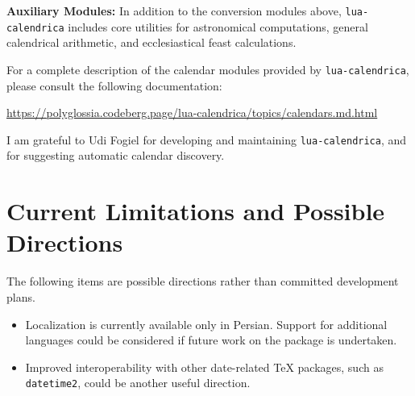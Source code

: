 \documentclass[10pt]{article}
\begin{document}
\noindent\textbf{Auxiliary Modules:} In addition to the conversion modules above, \texttt{lua-calendrica} includes core utilities for astronomical computations, general calendrical arithmetic, and ecclesiastical feast calculations.


For a complete description of the calendar modules provided by
\texttt{lua-calendrica}, please consult the following documentation:

\begin{center}
    \url{https://polyglossia.codeberg.page/lua-calendrica/topics/calendars.md.html}
\end{center}

I am grateful to Udi Fogiel for developing and maintaining \texttt{lua-calendrica}, and for suggesting automatic calendar discovery.

\section{Current Limitations and Possible Directions}
The following items are possible directions rather than committed development plans.

\begin{itemize}
    \item Localization is currently available only in Persian. Support for additional
          languages could be considered if future work on the package is undertaken.


    \item Improved interoperability with other date-related \TeX{} packages, such as
          \texttt{datetime2}, could be another useful direction.
\end{itemize}
\end{document}
